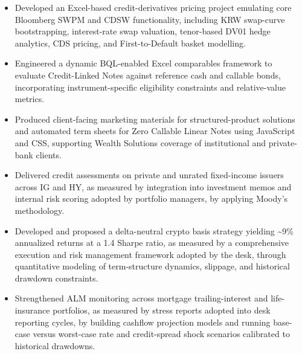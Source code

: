 \documentclass{article}
\begin{document}
\begin{itemize}
  \item Developed an Excel-based credit-derivatives pricing project emulating core Bloomberg SWPM and CDSW functionality, including KRW swap-curve bootstrapping, interest-rate swap valuation, tenor-based DV01 hedge analytics, CDS pricing, and First-to-Default basket modelling.
  \item Engineered a dynamic BQL-enabled Excel comparables framework to evaluate Credit-Linked Notes against reference cash and callable bonds, incorporating instrument-specific eligibility constraints and relative-value metrics.
  \item Produced client-facing marketing materials for structured-product solutions and automated term sheets for Zero Callable Linear Notes using JavaScript and CSS, supporting Wealth Solutions coverage of institutional and private-bank clients.
\end{itemize}
\entrygap
{}
\begin{itemize}
  \item Delivered credit assessments on private and unrated fixed-income issuers across IG and HY, as measured by integration into investment memos and internal risk scoring adopted by portfolio managers, by applying Moody's methodology.
  \item Developed and proposed a delta-neutral crypto basis strategy yielding \textasciitilde{}9\% annualized returns at a 1.4 Sharpe ratio, as measured by a comprehensive execution and risk management framework adopted by the desk, through quantitative modeling of term-structure dynamics, slippage, and historical drawdown constraints.
  \item Strengthened ALM monitoring across mortgage trailing-interest and life-insurance portfolios, as measured by stress reports adopted into desk reporting cycles, by building cashflow projection models and running base-case versus worst-case rate and credit-spread shock scenarios calibrated to historical drawdowns.
\end{itemize}
\entrygap
{}
\end{document}
